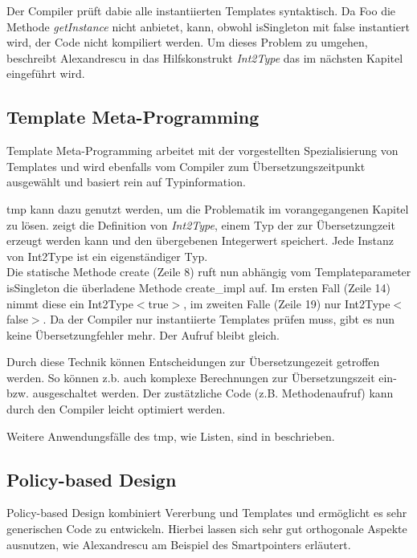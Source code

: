 

 Der Compiler prüft dabie alle instantiierten Templates syntaktisch. Da Foo die Methode \emph{getInstance} nicht anbietet, kann, obwohl isSingleton mit false instantiert wird, der Code nicht kompiliert werden. Um dieses Problem zu umgehen, beschreibt Alexandrescu in \cite{Alexandrescu2001Modern} das Hilfskonstrukt \emph{Int2Type} das im nächsten Kapitel eingeführt wird.

\subsection{Template Meta-Programming}
Template Meta-Programming arbeitet mit der vorgestellten Spezialisierung von Templates und wird ebenfalls vom Compiler zum Übersetzungszeitpunkt ausgewählt und basiert rein auf Typinformation.

\ac{tmp} kann dazu genutzt werden, um die Problematik im vorangegangenen Kapitel zu lösen.  zeigt die Definition von \emph{Int2Type}, einem Typ der zur Übersetzungzeit erzeugt werden kann und den übergebenen Integerwert speichert. Jede Instanz von Int2Type ist ein eigenständiger Typ.\\
Die statische Methode create (Zeile 8) ruft nun abhängig vom Templateparameter isSingleton die überladene Methode create\_impl auf. Im ersten Fall (Zeile 14) nimmt diese ein Int2Type$<$true$>$, im zweiten Falle (Zeile 19) nur Int2Type$<$false$>$. Da der Compiler nur instantiierte Templates prüfen muss, gibt es nun keine Übersetzungfehler mehr. Der Aufruf bleibt gleich.



Durch diese Technik können Entscheidungen zur Übersetzungezeit getroffen werden. So können z.b. auch komplexe Berechnungen zur Übersetzungszeit ein- bzw. ausgeschaltet werden. Der zustätzliche Code (z.B. Methodenaufruf) kann durch den Compiler leicht optimiert werden.

Weitere Anwendungsfälle des \ac{tmp}, wie Listen, sind in  \cite{Alexandrescu2001Modern} beschrieben.

\subsection{Policy-based Design}
Policy-based Design kombiniert Vererbung und Templates und ermöglicht es sehr generischen Code zu entwickeln. Hierbei lassen sich sehr gut orthogonale Aspekte ausnutzen, wie Alexandrescu am Beispiel des Smartpointers erläutert.

